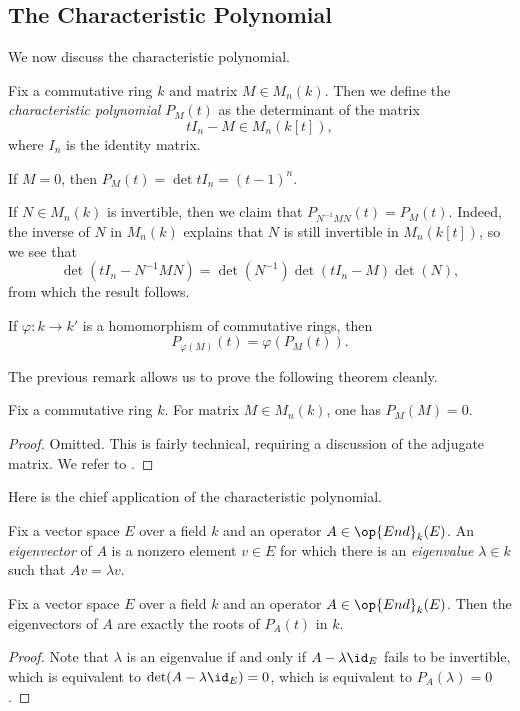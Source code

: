 \documentclass[../notes.tex]{subfiles}
\begin{document}
\subsection{The Characteristic Polynomial}
We now discuss the characteristic polynomial.
\begin{definition}
	Fix a commutative ring $k$ and matrix $M\in M_n(k)$. Then we define the \textit{characteristic polynomial} $P_M(t)$ as the determinant of the matrix
	\[tI_n-M\in M_n(k[t]),\]
	where $I_n$ is the identity matrix.
\end{definition}
\begin{example}
	If $M=0$, then $P_M(t)=\det tI_n=(t-1)^n$.
\end{example}
\begin{remark}
	If $N\in M_n(k)$ is invertible, then we claim that $P_{N^{-1}MN}(t)=P_M(t)$. Indeed, the inverse of $N$ in $M_n(k)$ explains that $N$ is still invertible in $M_n(k[t])$, so we see that
	\[\det\left(tI_n-N^{-1}MN\right)=\det\left(N^{-1}\right)\det\left(tI_n-M\right)\det(N),\]
	from which the result follows.
\end{remark}
\begin{remark}
	If $\varphi\colon k\to k'$ is a homomorphism of commutative rings, then
	\[P_{\varphi(M)}(t)=\varphi(P_M(t)).\]
\end{remark}
The previous remark allows us to prove the following theorem cleanly.
\begin{theorem}
	Fix a commutative ring $k$. For matrix $M\in M_n(k)$, one has $P_M(M)=0$.
\end{theorem}
\begin{proof}
	Omitted. This is fairly technical, requiring a discussion of the adjugate matrix. We refer to \cite[Theorem~XIV.3.1]{lang-algebra}.
\end{proof}
Here is the chief application of the characteristic polynomial.
\begin{definition}[eigenvalue]
	Fix a vector space $E$ over a field $k$ and an operator $A\in\op{End}_k(E)$. An \textit{eigenvector} of $A$ is a nonzero element $v\in E$ for which there is an \textit{eigenvalue} $\lambda\in k$ such that $Av=\lambda v$.
\end{definition}
\begin{theorem}
	Fix a vector space $E$ over a field $k$ and an operator $A\in\op{End}_k(E)$. Then the eigenvectors of $A$ are exactly the roots of $P_A(t)$ in $k$.
\end{theorem}
\begin{proof}
	Note that $\lambda$ is an eigenvalue if and only if $A-\lambda\id_E$ fails to be invertible, which is equivalent to $\det(A-\lambda{\id_E})=0$, which is equivalent to $P_A(\lambda)=0$.
\end{proof}
\end{document}
